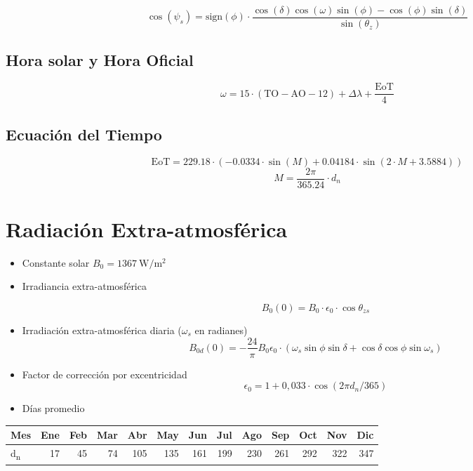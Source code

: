 \documentclass[article, a4paper]{memoir}
\begin{document}
\[
  \cos(\psi_{s}) = \mathrm{sign}(\phi) \cdot \frac{\cos(\delta) \cos(\omega) \sin(\phi) - \cos(\phi) \sin(\delta)} {\sin(\theta_{z})}
\]
\subsection{Hora solar y Hora Oficial}
\label{sec:orgdd7065a}

\[\omega=15\cdot(\mathrm{TO}-\mathrm{AO}-12)+\Delta\lambda+\frac{\mathrm{EoT}}{4}\]

\subsection{Ecuación del Tiempo}
\label{sec:org6fd16b9}

\[
\mathrm{EoT}=229.18\cdot\left(-0.0334\cdot\sin(M)+0.04184\cdot\sin\left(2\cdot
      M+3.5884\right)\right)
\]
\[
M=\frac{2\pi}{365.24}\cdot d_{n}
\]



\section{Radiación Extra-atmosférica}
\label{sec:org70354fa}

\begin{itemize}
\item Constante solar \(B_{0}=\SI{1367}{\watt\per\meter\squared}\)

\item Irradiancia extra-atmosférica

\[B_{0}(0)=B_{0}\cdot\epsilon_{0}\cdot\cos\theta_{zs}\]

\item Irradiación extra-atmosférica diaria  (\(\omega_{s}\) en radianes)
\[
  B_{0d}(0)=-\frac{24}{\pi}B_{0}\epsilon_{0}\cdot\left(\omega_{s}\sin\phi\sin\delta+\cos\delta\cos\phi\sin\omega_{s}\right)
\]

\item Factor de corrección por excentricidad
\[\epsilon_0 = 1+0,033\cdot\cos(2\pi d_n/365)\]
\end{itemize}


\begin{itemize}
\item Días promedio
\end{itemize}

\begin{center}
\begin{tabular}{lrrrrrrrrrrrr}
Mes & Ene & Feb & Mar & Abr & May & Jun & Jul & Ago & Sep & Oct & Nov & Dic\\
\hline
d\textsubscript{n} & 17 & 45 & 74 & 105 & 135 & 161 & 199 & 230 & 261 & 292 & 322 & 347\\
\end{tabular}
\end{center}
\end{document}
